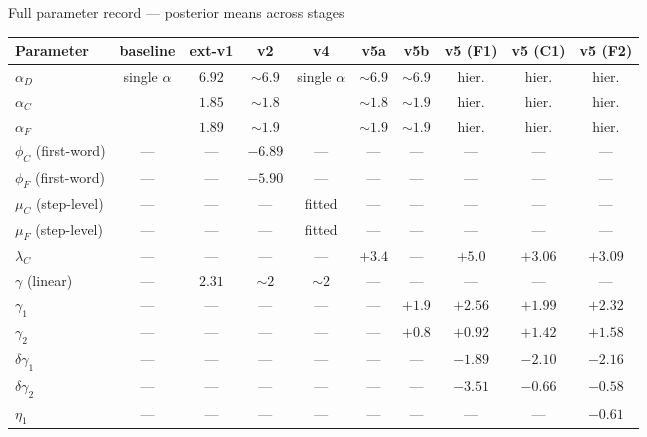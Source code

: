 \documentclass[10pt,aspectratio=169]{beamer}
\newcommand{\main}[1]{\textcolor{CSP-main-dark}{\textbf{#1}}}
\newcommand{\emp}[1]{\textcolor{CSP-emphasis}{\textbf{#1}}}
\newcommand{\muted}[1]{\textcolor{CSP-text-light}{#1}}
\begin{document}
\begin{frame}{Full parameter record --- posterior means across stages}
\scriptsize
\begin{center}
\renewcommand{\arraystretch}{1.10}
\begin{tabular}{l cc cc ccccc}
\toprule
Parameter & baseline & ext-v1 & \muted{v2} & \muted{v4} & v5a & v5b & v5 (F1) & v5 (C1) & v5 (F2) \\
\midrule
$\alpha_D$           & single $\alpha$ & $6.92$ & $\sim 6.9$ & single $\alpha$ & $\sim 6.9$ & $\sim 6.9$ & hier. & hier. & hier. \\
$\alpha_C$           &                 & $1.85$ & $\sim 1.8$ &                 & $\sim 1.8$ & $\sim 1.9$ & hier. & hier. & hier. \\
$\alpha_F$           &                 & $1.89$ & $\sim 1.9$ &                 & $\sim 1.9$ & $\sim 1.9$ & hier. & hier. & hier. \\
\midrule
$\phi_C$ (first-word) & ---   & ---    & \emp{$-6.89$} & ---    & ---   & ---    & ---    & ---    & ---     \\
$\phi_F$ (first-word) & ---   & ---    & \emp{$-5.90$} & ---    & ---   & ---    & ---    & ---    & ---     \\
$\mu_C$ (step-level)  & ---   & ---    & ---    & fitted & ---   & ---    & ---    & ---    & ---     \\
$\mu_F$ (step-level)  & ---   & ---    & ---    & fitted & ---   & ---    & ---    & ---    & ---     \\
\midrule
$\lambda_C$           & ---   & ---    & ---    & ---    & \main{$+3.4$} & ---    & \main{$+5.0$} & \main{$+3.06$} & \main{$+3.09$} \\
$\gamma$ (linear)     & ---   & $2.31$ & $\sim 2$ & $\sim 2$ & ---   & ---    & ---    & ---    & ---    \\
$\gamma_1$            & ---   & ---    & ---    & ---    & ---   & $+1.9$ & $+2.56$ & $+1.99$ & $+2.32$ \\
$\gamma_2$            & ---   & ---    & ---    & ---    & ---   & $+0.8$ & $+0.92$ & $+1.42$ & $+1.58$ \\
$\delta\gamma_1$      & ---   & ---    & ---    & ---    & ---   & ---    & $-1.89$ & $-2.10$ & $-2.16$ \\
$\delta\gamma_2$      & ---   & ---    & ---    & ---    & ---   & ---    & $-3.51$ & $-0.66$ & $-0.58$ \\
$\eta_1$              & ---   & ---    & ---    & ---    & ---   & ---    & ---    & ---    & $-0.61$ \\

\end{tabular}
\end{center}
\end{frame}
\end{document}
